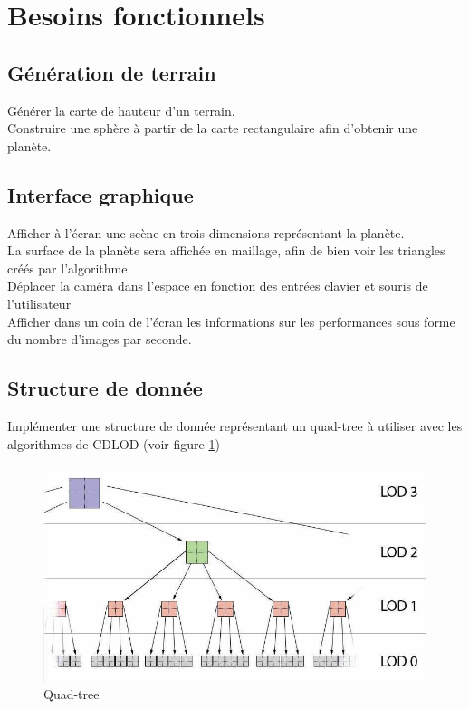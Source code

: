 \documentclass[12pt]{report}
\begin{document}


\section{Besoins fonctionnels}

\subsection{Génération de terrain}

Générer la carte de hauteur d'un terrain.\\
Construire une sphère à partir de la carte rectangulaire afin d'obtenir
une planète.


\subsection{Interface graphique}

Afficher à l'écran une scène en trois dimensions représentant la planète.\\
La surface de la planète sera affichée en maillage, afin de bien voir
les triangles créés par l'algorithme.\\
Déplacer la caméra dans l'espace en fonction des entrées clavier et
souris de l'utilisateur\\
Afficher dans un coin de l'écran les informations sur les performances sous forme du nombre d'images par seconde.

\subsection{Structure de donnée}

Implémenter une structure de donnée représentant un quad-tree à utiliser avec les algorithmes de CDLOD (voir figure \ref{fig:quadtree})

\begin{figure}[!ht]
  \includegraphics[scale=0.5]{img/Quadtree.png}
  \caption{Quad-tree}
  \label{fig:quadtree}
\end{figure}
\end{document}
